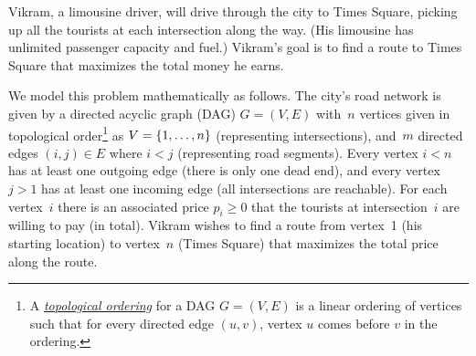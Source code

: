\documentclass[11pt,addpoints,answers]{exam}
\begin{document}
\begin{questions}
  Vikram, a limousine driver, will drive through the city to Times Square, picking up all the tourists at each intersection along the way.
  (His limousine has unlimited passenger capacity and fuel.)
  Vikram's goal is to find a route to Times Square that maximizes the total money he earns.

  We model this problem mathematically as follows.
  The city's road network is given by a directed acyclic graph (DAG) $G=(V,E)$ with~$n$ vertices given in topological order\footnote{A \href{https://en.wikipedia.org/wiki/Topological_sorting}{\emph{topological ordering}} for a DAG $G=(V,E)$ is a linear ordering of vertices such that for every directed edge $(u,v)$, vertex $u$ comes before $v$ in the ordering.} as $V=\{1,\ldots,n\}$ (representing intersections), and~$m$ directed edges $(i,j) \in E$ where $i < j$ (representing road segments).
  Every vertex $i < n$ has at least one outgoing edge (there is only one dead end), and every vertex $j > 1$ has at least one incoming edge (all intersections are reachable).
  For each vertex~$i$ there is an associated price $p_{i} \geq 0$ that the tourists at intersection~$i$ are willing to pay (in total).
  Vikram wishes to find a route from vertex~1 (his starting location) to vertex~$n$ (Times Square) that maximizes the total price along the route.
  
\end{questions}
\end{document}
